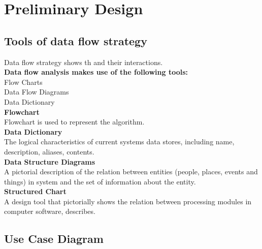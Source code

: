 \chapter{Preliminary  Design}

\section{Tools of data flow strategy}
	Data flow strategy shows th and their interactions.\\
\textbf{Data flow analysis makes use of the following tools:}\\
Flow Charts\\
Data Flow Diagrams\\
Data Dictionary\\
\textbf{Flowchart}\\
Flowchart is used to represent the algorithm.\\
\textbf{Data Dictionary}\\
The logical characteristics of current systems data stores, including name, description, aliases, contents.\\
\textbf{Data Structure Diagrams}\\
A pictorial description of the relation between entities (people, places, events and things) in system and the set of information about the entity.\\
\textbf{Structured Chart}\\
A design tool that pictorially shows the relation between processing modules in computer software, describes.



\section{Use Case Diagram}
